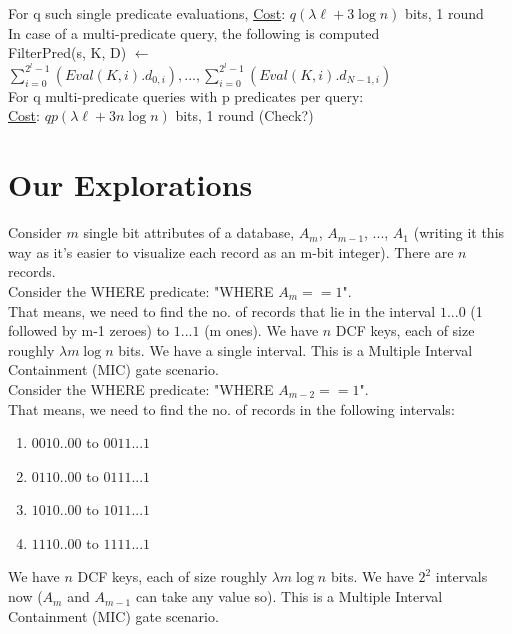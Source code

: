 For q such single predicate evaluations, \underline{Cost}: $q(\lambda \ell + 3 \log n)$ bits, 1 round \\

In case of a multi-predicate query, the following is computed \\

FilterPred(s, K, D) $\leftarrow$ $\sum_{i = 0}^{2^l-1}(Eval(K, i).d_{0, i}), ... , \sum_{i = 0}^{2^l-1}(Eval(K, i).d_{N-1, i})$ \\

For q multi-predicate queries with p predicates per query:\\

\underline{Cost}: $qp(\lambda \ell + 3n \log n)$ bits, 1 round (Check?)

\section{Our Explorations}

Consider $m$ single bit attributes of a database, $A_m$, $A_{m-1}$, ..., $A_1$ (writing it this way as it's easier to visualize each record as an m-bit integer). There are $n$ records. \\

Consider the WHERE predicate: "WHERE $A_m == 1$". \\

That means, we need to find the no. of records that lie in the interval $1...0$ (1 followed by m-1 zeroes) to $1...1$ (m ones). We have $n$ DCF keys, each of size roughly $\lambda m \log n$ bits. We have a single interval. This is a Multiple Interval Containment (MIC) gate scenario. \\

Consider the WHERE predicate: "WHERE $A_{m-2} == 1$". \\

That means, we need to find the no. of records in the following intervals:
\begin{enumerate}
    \item $0010..00$ to $0011...1$
    \item $0110..00$ to $0111...1$
    \item $1010..00$ to $1011...1$
    \item $1110..00$ to $1111...1$
\end{enumerate}

We have $n$ DCF keys, each of size roughly $\lambda m \log n$ bits. We have $2^2$ intervals now ($A_m$ and $A_{m-1}$ can take any value so). This is a Multiple Interval Containment (MIC) gate scenario. \\

